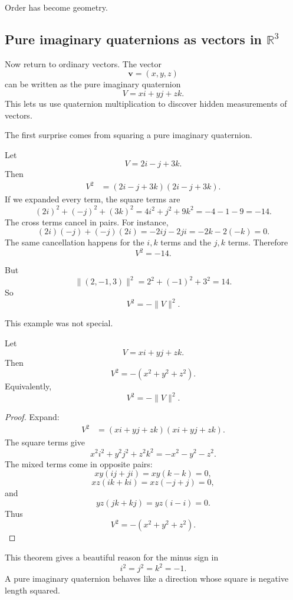 Order has become geometry.

\subsection{Pure imaginary quaternions as vectors in \(\mathbb R^3\)}

Now return to ordinary vectors.  The vector
\[
    \mathbf v=(x,y,z)
\]
can be written as the pure imaginary quaternion
\[
    V=xi+yj+zk.
\]
This lets us use quaternion multiplication to discover hidden measurements of vectors.

The first surprise comes from squaring a pure imaginary quaternion.

\begin{example}
Let
\[
    V=2i-j+3k.
\]
Then
\[
\begin{aligned}
    V^2
    &=(2i-j+3k)(2i-j+3k).
\end{aligned}
\]
If we expanded every term, the square terms are
\[
    (2i)^2+(-j)^2+(3k)^2
    =
    4i^2+j^2+9k^2
    =
    -4-1-9
    =
    -14.
\]
The cross terms cancel in pairs.  For instance,
\[
    (2i)(-j)+(-j)(2i)
    =
    -2ij-2ji
    =
    -2k-2(-k)
    =
    0.
\]
The same cancellation happens for the \(i,k\) terms and the \(j,k\) terms.  Therefore
\[
    V^2=-14.
\]

But
\[
    \|(2,-1,3)\|^2=2^2+(-1)^2+3^2=14.
\]
So
\[
    V^2=-\|V\|^2.
\]
\end{example}

This example was not special.

\begin{theorem}
Let
\[
    V=xi+yj+zk.
\]
Then
\[
    V^2=-(x^2+y^2+z^2).
\]
Equivalently,
\[
    V^2=-\|V\|^2.
\]
\end{theorem}

\begin{proof}
Expand:
\[
\begin{aligned}
V^2
&=(xi+yj+zk)(xi+yj+zk).
\end{aligned}
\]
The square terms give
\[
    x^2i^2+y^2j^2+z^2k^2
    =
    -x^2-y^2-z^2.
\]
The mixed terms come in opposite pairs:
\[
    xy(ij+ji)=xy(k-k)=0,
\]
\[
    xz(ik+ki)=xz(-j+j)=0,
\]
and
\[
    yz(jk+kj)=yz(i-i)=0.
\]
Thus
\[
    V^2=-(x^2+y^2+z^2).
\]
\end{proof}

This theorem gives a beautiful reason for the minus sign in
\[
    i^2=j^2=k^2=-1.
\]
A pure imaginary quaternion behaves like a direction whose square is negative length
squared.

